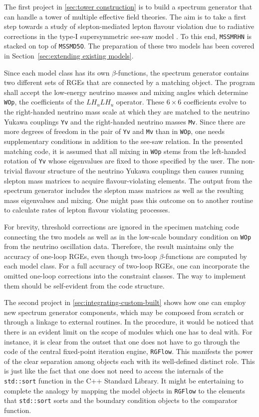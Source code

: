 \documentclass[final,3p,11pt,pdflatex]{elsarticle}
\newcommand{\code}[1]{\lstinline|#1|}  %
\newcommand{\secref}[1]{Section~\ref{#1}}
\begin{document}
The first project in \ref{sec:tower construction} is
to build a spectrum generator that can handle
a tower of multiple effective field theories.
The aim is to take a first step towards
a study of slepton-mediated lepton flavour violation
due to radiative corrections in the type-I supersymmetric see-saw model
\cite{Borzumati:1986qx}.
To this end, \code{MSSMRHN} is stacked on top of \code{MSSMD5O}.
The preparation of these two models has been covered in
\secref{sec:extending existing models}.

Since each model class has its own $\beta$-functions,
the spectrum generator contains two different sets of RGEs
that are connected by a matching object.
The program shall accept
the low-energy neutrino masses and mixing angles
which determine \code{WOp}, the coefficients
of the $L H_u L H_u$ operator.
These $6 \times 6$ coefficients evolve to
the right-handed neutrino mass scale at which
they are matched to the neutrino Yukawa couplings \code{Yv} and
the right-handed neutrino masses \code{Mv}.
Since there are more degrees of freedom in the pair of
\code{Yv} and \code{Mv} than in \code{WOp},
one needs supplementary conditions in addition to the see-saw relation.
In the presented matching code, it is assumed that all mixing in \code{WOp}
stems from the left-handed rotation of \code{Yv} whose eigenvalues are
fixed to those specified by the user.
The non-trivial flavour structure of the neutrino Yukawa couplings then
causes running slepton mass matrices to acquire flavour-violating elements.
The output from the spectrum generator includes
the slepton mass matrices as well as
the resulting mass eigenvalues and mixing.
One might pass this outcome on to another routine
to calculate rates of lepton flavour violating processes.

For brevity,
threshold corrections are ignored
in the specimen matching code connecting the two models
as well as in the low-scale boundary condition on \code{WOp}
from the neutrino oscillation data.
Therefore, the result maintains only the accuracy of one-loop RGEs,
even though two-loop $\beta$-functions are computed by each model class.
For a full accuracy of two-loop RGEs, one can incorporate the omitted
one-loop corrections into the constraint classes.
The way to implement them should be self-evident from the code structure.

The second project in \ref{sec:integrating-custom-built} shows
how one can employ new spectrum generator components,
which may be composed from scratch or through
a linkage to external routines.
In the procedure,
it would be noticed that there is an evident limit on the scope of
modules which one has to deal with.
For instance, it is clear from the outset
that one does not have to go through the code of the central
fixed-point iteration engine, \code{RGFlow}.
This manifests the power of the clear separation among objects
each with its well-defined distinct role.
This is just like the fact that one does not need to access the internals
of the \code{std::sort} function in the C++ Standard Library.
It might be entertaining to complete the analogy by
mapping the model objects in \code{RGFlow}
to the elements that \code{std::sort} sorts
and the boundary condition objects
to the comparator function.
\end{document}
